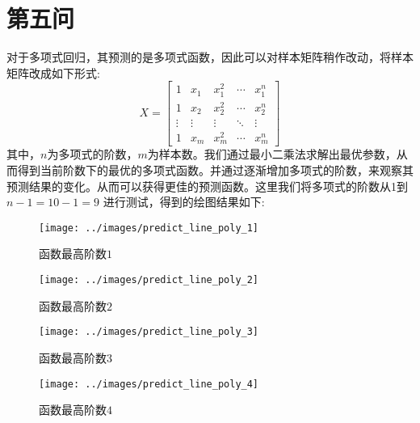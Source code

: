 \documentclass[UTF8]{article} %
\begin{document}
    \section{第五问}
    对于多项式回归，其预测的是多项式函数，因此可以对样本矩阵稍作改动，将样本矩阵改成如下形式:
    \begin{equation}
        X = \begin{bmatrix}
                1      & x_1    & x_1^2  & \cdots & x_1^n  \\
                1      & x_2    & x_2^2  & \cdots & x_2^n  \\
                \vdots & \vdots & \vdots & \ddots & \vdots \\
                1      & x_m    & x_m^2  & \cdots & x_m^n
        \end{bmatrix}
        \label{eq:poly_x}
    \end{equation}
    其中，$n$为多项式的阶数，$m$为样本数。我们通过最小二乘法求解出最优参数，从而得到当前阶数下的最优的多项式函数。并通过逐渐增加多项式的阶数，来观察其预测结果的变化。从而可以获得更佳的预测函数。这里我们将多项式的阶数从1到$n-1 = 10 - 1 = 9$ 进行测试，得到的绘图结果如下:

    \begin{figure}[H]
        \begin{minipage}[b]{0.24\linewidth}
            \centering
            \texttt{[image: ../images/predict\_line\_poly\_1]}
            \caption{函数最高阶数$1$}
            \label{fig:poly_1}
        \end{minipage}
        \begin{minipage}[b]{0.24\linewidth}
            \centering
            \texttt{[image: ../images/predict\_line\_poly\_2]}
            \caption{函数最高阶数$2$}
            \label{fig:poly_2}
        \end{minipage}
        \begin{minipage}[b]{0.24\linewidth}
            \centering
            \texttt{[image: ../images/predict\_line\_poly\_3]}
            \caption{函数最高阶数$3$}
            \label{fig:poly_3}
        \end{minipage}
        \begin{minipage}[b]{0.24\linewidth}
            \centering
            \texttt{[image: ../images/predict\_line\_poly\_4]}
            \caption{函数最高阶数$4$}
            \label{fig:poly_4}
        \end{minipage}
    \end{figure}
\end{document}
